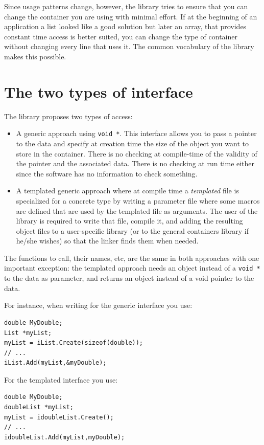 \documentclass[12pt,a4paper,openany]{memoir} %
\begin{document}
Since usage patterns change, however, the library tries to ensure that you can change the container you are using with minimal effort. If at the 
beginning of an application a list looked like a good solution but later an array, that provides constant time access is better suited, you can change 
the type of container without changing every line that uses it. The common vocabulary of the library makes this possible.

\section{The two types of interface}
\label{TwoTypes}
The library proposes two types of access:
\begin{itemize}
\item A generic approach using \verb,void *,. This interface allows you to pass a pointer to the data and specify at creation time the size of the 
object you want to store in the container. There is no checking at compile-time of the validity of the pointer and the associated data. There is no 
checking at run time either since the software has no information to check something.
\item A templated generic approach where at compile time a \textsl{templated} file is specialized for a concrete type by writing a parameter file
where some macros are defined that are used by the templated file as arguments. The user of the library is required to write that file, compile
it, and adding the resulting object files to a user-specific library (or to the general containers library if he/she wishes) so that the linker finds 
them when needed.

\end{itemize}
The functions to call, their names, etc, are the same in both approaches with one important exception: the templated approach needs an object instead 
of a \verb,void *, to the data as parameter, and returns an object instead of a void pointer to the data.

For instance, when writing for the generic interface you use:
\begin{verbatim}
double MyDouble;
List *myList;
myList = iList.Create(sizeof(double));
// ...
iList.Add(myList,&myDouble);
\end{verbatim}

For the templated interface you use:
\begin{verbatim}
double MyDouble;
doubleList *myList;
myList = idoubleList.Create();
// ...
idoubleList.Add(myList,myDouble);
\end{verbatim}
\end{document}
